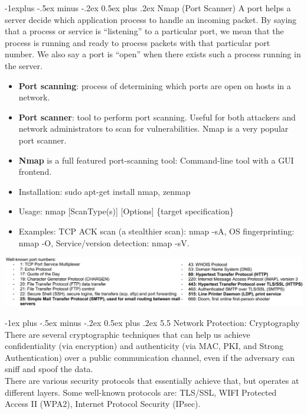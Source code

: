 \documentclass[10pt, landscape]{article}
\makeatletter
\renewcommand{\section}{\@startsection{section}{1}{0mm}%
                                {-1ex plus -.5ex minus -.2ex}%
                                {0.5ex plus .2ex}%
                                {\normalfont\large\bfseries}}
\renewcommand{\subsection}{\@startsection{subsection}{2}{0mm}%
                                {-1explus -.5ex minus -.2ex}%
                                {0.5ex plus .2ex}%
                                {\normalfont\normalsize\bfseries}}
\makeatother
\begin{document}
\begin{multicols*}{3}
\subsection{Nmap (Port Scanner)}
A port helps a server decide which application process to handle an incoming packet. By saying that a process or service is “listening” to a particular port, we mean that the process is running and ready to process packets with that particular port number. We also say a port 
is “open” when there exists such a process running in the server. 
\begin{itemize}
\item \textbf{Port scanning}: process of determining which ports are open on hosts in a network.
\item \textbf{Port scanner}: tool to perform port scanning. Useful for both attackers and 
network administrators to scan for vulnerabilities. Nmap is a very popular port scanner.
\item \textbf{Nmap} is a full featured port-scanning tool: Command-line tool with a GUI frontend.
\item Installation: sudo apt-get install nmap, zenmap 
\item Usage: nmap [ScanType(s)] [Options] \{target specification\}
\item Examples: TCP ACK scan (a stealthier scan): nmap -sA, OS fingerprinting: nmap -O, Service/version detection: nmap -sV.
\end{itemize}

\centerline{\includegraphics[width=1\linewidth]{portNumbers}}

\section{5.5 Network Protection: Cryptography}
There are several cryptographic techniques that can help us achieve confidentiality (via encryption) and authenticity (via MAC, PKI, and Strong Authentication) over a public communication channel, even if the adversary can sniff and spoof the data.
\\ \smallskip
There are various security protocols that essentially achieve that, but operates at different layers. Some well-known protocols are:
TLS/SSL, WIFI Protected Access II (WPA2), Internet Protocol Security (IPsec). 


\end{multicols*}
\end{document}
